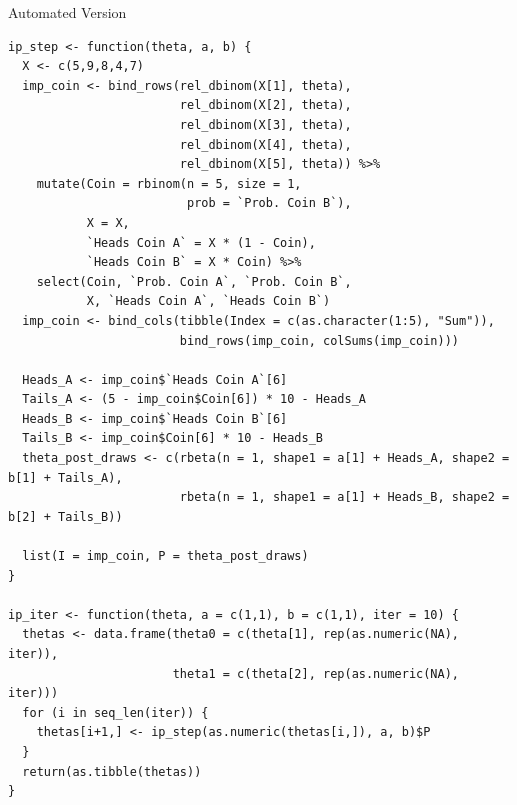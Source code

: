 \documentclass[dvipdfmx,bigger,aspectratio=169]{beamer}
\begin{document}
\begin{frame}[fragile,allowframebreaks,label=,t]{Automated Version}
 \scriptsize
\begin{verbatim}
ip_step <- function(theta, a, b) {
  X <- c(5,9,8,4,7)
  imp_coin <- bind_rows(rel_dbinom(X[1], theta),
                        rel_dbinom(X[2], theta),
                        rel_dbinom(X[3], theta),
                        rel_dbinom(X[4], theta),
                        rel_dbinom(X[5], theta)) %>%
    mutate(Coin = rbinom(n = 5, size = 1,
                         prob = `Prob. Coin B`),
           X = X,
           `Heads Coin A` = X * (1 - Coin),
           `Heads Coin B` = X * Coin) %>%
    select(Coin, `Prob. Coin A`, `Prob. Coin B`,
           X, `Heads Coin A`, `Heads Coin B`)
  imp_coin <- bind_cols(tibble(Index = c(as.character(1:5), "Sum")),
                        bind_rows(imp_coin, colSums(imp_coin)))

  Heads_A <- imp_coin$`Heads Coin A`[6]
  Tails_A <- (5 - imp_coin$Coin[6]) * 10 - Heads_A
  Heads_B <- imp_coin$`Heads Coin B`[6]
  Tails_B <- imp_coin$Coin[6] * 10 - Heads_B
  theta_post_draws <- c(rbeta(n = 1, shape1 = a[1] + Heads_A, shape2 = b[1] + Tails_A),
                        rbeta(n = 1, shape1 = a[1] + Heads_B, shape2 = b[2] + Tails_B))

  list(I = imp_coin, P = theta_post_draws)
}

ip_iter <- function(theta, a = c(1,1), b = c(1,1), iter = 10) {
  thetas <- data.frame(theta0 = c(theta[1], rep(as.numeric(NA), iter)),
                       theta1 = c(theta[2], rep(as.numeric(NA), iter)))
  for (i in seq_len(iter)) {
    thetas[i+1,] <- ip_step(as.numeric(thetas[i,]), a, b)$P
  }
  return(as.tibble(thetas))
}
\end{verbatim}

\normalsize
\end{frame}
\end{document}
